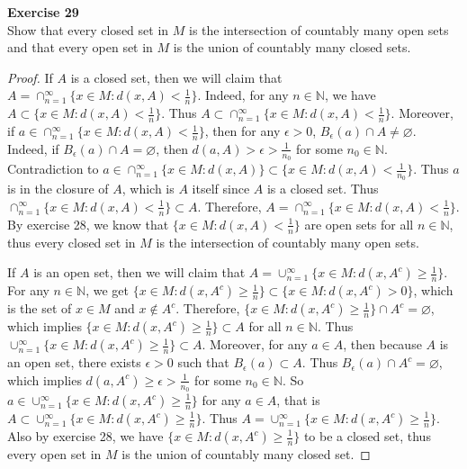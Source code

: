 \documentclass[12pt, a4paper]{article}
\theoremstyle{plain}
\newcommand{\N}{\mathbb{N}}
\newenvironment{exercise}[2][Exercise]
    { \begin{mdframed}[backgroundcolor=gray!20] \textbf{#1 #2} \\}
    {  \end{mdframed}}
\begin{document}
\begin{exercise}{29}
Show that every closed set in $M$ is the intersection of countably many open sets and that every open set in $M$ is the union of countably many closed sets.
\end{exercise}
    \begin{proof}
    If $A$ is a closed set, then we will claim that $A=\cap_{n=1}^\infty\{x\in M: d(x,A)<\frac{1}{n}\}$. Indeed, for any $n\in \N$, we have $A\subset \{x\in M:d(x,A)<\frac{1}{n}\}$. Thus $A\subset \cap_{n=1}^\infty\{x\in M: d(x,A)<\frac{1}{n}\}$. Moreover, if $a\in \cap_{n=1}^\infty\{x\in M: d(x,A)<\frac{1}{n}\}$, then for any $\epsilon>0$, $B_\epsilon(a)\cap A\neq \varnothing$. Indeed, if $B_\epsilon(a)\cap A= \varnothing$, then $d(a,A)>\epsilon>\frac{1}{n_0}$ for some $n_0\in\N$. Contradiction to $a\in \cap_{n=1}^\infty\{x\in M: d(x,A)\}\subset \{x\in M:d(x,A)<\frac{1}{n_0}\}$. Thus $a$ is in the closure of $A$, which is $A$ itself since $A$ is a closed set. Thus $\cap_{n=1}^\infty\{x\in M: d(x,A)<\frac{1}{n}\}\subset A$. Therefore, $A=\cap_{n=1}^\infty\{x\in M: d(x,A)<\frac{1}{n}\}$. By exercise 28, we know that $\{x\in M: d(x,A)<\frac{1}{n}\}$ are open sets for all $n\in \N$, thus every closed set in $M$ is the intersection of countably many open sets.
    
    If $A$ is an open set, then we will claim that $A=\cup_{n=1}^\infty \{x\in M: d(x,A^c)\geq \frac{1}{n}\}$. For any $n\in \N$, we get $\{x\in M:d(x,A^c)\geq \frac{1}{n}\}\subset \{x\in M:d(x,A^c)>0\}$, which is the set of $x\in M$ and $x\notin A^c$. Therefore, $\{x\in M:d(x,A^c)\geq \frac{1}{n}\}\cap A^c=\varnothing$, which implies $\{x\in M:d(x,A^c)\geq \frac{1}{n}\}\subset A$ for all $n\in\N$. Thus $\cup_{n=1}^\infty \{x\in M: d(x,A^c)\geq \frac{1}{n}\}\subset A$. Moreover, for any $a\in A$, then because $A$ is an open set, there exists $\epsilon>0$ such that $B_\epsilon(a)\subset A$. Thus $B_\epsilon(a)\cap A^c=\varnothing$, which implies $d(a,A^c)\geq \epsilon>\frac{1}{n_0}$ for some $n_0\in \N$. So $a\in \cup_{n=1}^\infty \{x\in M: d(x,A^c)\geq \frac{1}{n}\}$ for any $a\in A$, that is $A\subset \cup_{n=1}^\infty \{x\in M: d(x,A^c)\geq \frac{1}{n}\}$. Thus $A=\cup_{n=1}^\infty \{x\in M: d(x,A^c)\geq \frac{1}{n}\}$. Also by exercise 28, we have $\{x\in M: d(x,A^c)\geq \frac{1}{n}\}$ to be a closed set, thus every open set in $M$ is the union of countably many closed set.
    \end{proof}

\pagebreak
\end{document}
